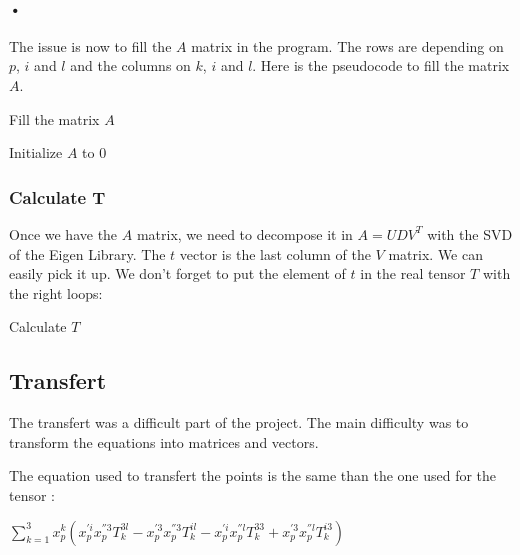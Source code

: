 \documentclass{report}
\begin{document}
\paragraph{•}
The issue is now to fill the $A$ matrix in the program. The rows are depending on $p$, $i$ and $l$ and the columns on $k$, $i$ and $l$. Here is the pseudocode to fill the matrix $A$. 

\begin{algorithm}
\SetLine
\caption{Fill the matrix $A$}
\SetLine
Initialize $A$ to 0

\end{algorithm}

\newpage
\subsubsection{Calculate T}
Once we have the $A$ matrix, we need to decompose it in $A=UDV^{T}$ with the SVD of the Eigen Library. The $t$ vector is the last column of the $V$ matrix. We can easily pick it up. 
We don't forget to put the element of $t$ in the real tensor $T$ with the right loops: 
\begin{algorithm}
\SetLine
\caption{Calculate $T$}
\SetLine
{}
\end{algorithm}



\textcolor{subtitle}{\subsection{Transfert}}
The transfert was a difficult part of the project. The main difficulty was to transform the equations into matrices and vectors.

The equation used to transfert the points is the same than the one used for the tensor : 
\begin{center}
 $ \displaystyle { \sum_{k = 1}^{3}} x_{p}^{k}(x_{p}^{'i}x_{p}^{''3}T_{k}^{3l} - x_{p}^{'3}x_{p}^{''3}T_{k}^{il} - x_{p}^{'i}x_{p}^{''l}T_{k}^{33} + x_{p}^{'3}x_{p}^{''l}T_{k}^{i3})$ 
\end{center}
\end{document}
